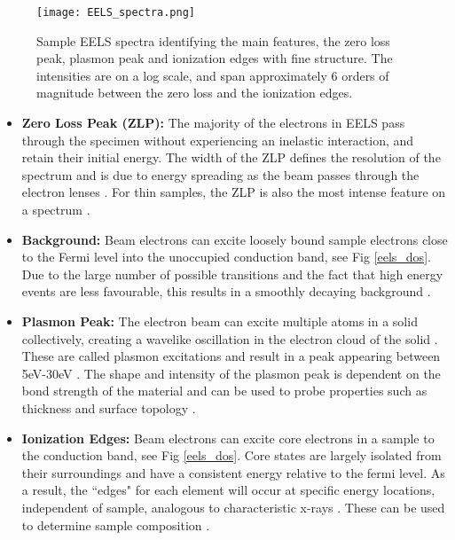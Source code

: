 \begin{figure}
	\centering
	\texttt{[image: EELS\_spectra.png]}
	\caption{Sample EELS spectra identifying the main features, the zero loss peak, plasmon peak and ionization edges with fine structure.   The intensities are on a log scale, and span approximately 6 orders of magnitude between the zero loss and the ionization edges.  }
	\label{EELS_spectra}
\end{figure}

\begin{itemize}
	\item \textbf{Zero Loss Peak (ZLP):} The majority of the electrons in EELS pass through the specimen without experiencing an inelastic interaction, and retain their initial energy.  The width of the ZLP defines the resolution of the spectrum and is due to energy spreading as the beam passes through the electron lenses \cite{colliex_illustrated_1985}.  For thin samples, the ZLP is also the most intense feature on a spectrum \cite{Egerton}.  
	
	\item  \textbf{Background:} Beam electrons can excite loosely bound sample electrons close to the Fermi level into the unoccupied conduction band, see Fig \ref{eels_dos}.  Due to the large number of possible transitions and the fact that high energy events are less favourable, this results in a smoothly decaying background \cite{Egerton}.
	
	\item \textbf{Plasmon Peak:}  The electron beam can excite multiple atoms in a solid collectively, creating a wavelike oscillation in the electron cloud of the solid \cite{Egerton}.  These are called plasmon excitations and result in a peak appearing between 5eV-30eV \cite{Egerton}.  The shape and intensity of the plasmon peak is dependent on the bond strength of the material and can be used to probe properties such as thickness and surface topology \cite{malis_eels_1988,nelayah_mapping_2007}. 
	
	\item \textbf{Ionization Edges:} Beam electrons can excite core electrons in a sample to the conduction band, see Fig \ref{eels_dos}.  Core states are largely isolated from their surroundings and have a consistent energy relative to the fermi level.  As a result, the ``edges" for each element will occur at specific energy locations, independent of sample, analogous to characteristic x-rays \cite{Egerton}. These can be used to determine sample composition \cite{Egerton}.  
	
	
	
\end{itemize}
 
